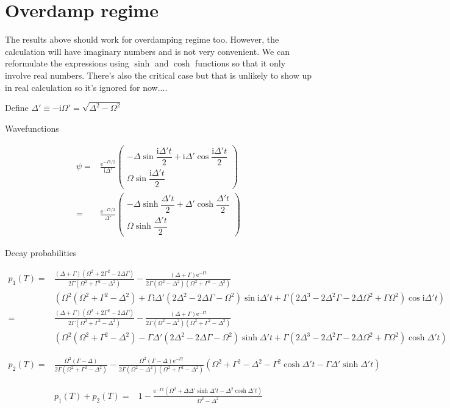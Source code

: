 \documentclass[10pt,fleqn]{article}
\newcommand{\ue}{\mathrm{e}}
\newcommand{\ui}{\mathrm{i}}
\newcommand{\eqar}[1]
{
  \begin{align*}
    #1
  \end{align*}
}
\newcommand{\paren}[1]{{\left({#1}\right)}}
\begin{document}
\section{Overdamp regime}
The results above should work for overdamping regime too.
However, the calculation will have imaginary numbers and is not very convenient.
We can reformulate the expressions using $\sinh$ and $\cosh$ functions so that it only involve
real numbers. There's also the critical case but that is unlikely to show up in real calculation
so it's ignored for now....

Define $\Delta'\equiv-\ui\Omega'=\sqrt{\Delta^2-\Omega^2}$

Wavefunctions
\eqar{
  \psi=&\frac{\ue^{-\Gamma t/2}}{\ui\Delta'}\begin{pmatrix}
    -\Delta\sin\dfrac{\ui\Delta't}{2}+\ui\Delta'\cos\dfrac{\ui\Delta't}{2}\\
    \Omega\sin\dfrac{\ui\Delta't}{2}
  \end{pmatrix}\\
  =&\frac{\ue^{-\Gamma t/2}}{\Delta'}\begin{pmatrix}
    -\Delta\sinh\dfrac{\Delta't}{2}+\Delta'\cosh\dfrac{\Delta't}{2}\\
    \Omega\sinh\dfrac{\Delta't}{2}
  \end{pmatrix}
}
Decay probabilities
\eqar{
  p_1(T)=&\frac{\paren{\Delta+\Gamma}\paren{\Omega^2+2\Gamma^2-2\Delta\Gamma}}{2\Gamma\paren{\Omega^2+\Gamma^2-\Delta^2}}-\frac{\paren{\Delta+\Gamma}\ue^{-\Gamma t}}{2\Gamma\paren{\Omega^2-\Delta^2}\paren{\Omega^2+\Gamma^2-\Delta^2}}\\
  &\paren{\Omega^2\paren{\Omega^2+\Gamma^2-\Delta^2}+\Gamma\ui\Delta'\paren{2\Delta^2-2\Delta\Gamma-\Omega^2}\sin\ui\Delta't+\Gamma\paren{2\Delta^3-2\Delta^2\Gamma-2\Delta\Omega^2+\Gamma\Omega^2}\cos\ui\Delta't}\\
  =&\frac{\paren{\Delta+\Gamma}\paren{\Omega^2+2\Gamma^2-2\Delta\Gamma}}{2\Gamma\paren{\Omega^2+\Gamma^2-\Delta^2}}-\frac{\paren{\Delta+\Gamma}\ue^{-\Gamma t}}{2\Gamma\paren{\Omega^2-\Delta^2}\paren{\Omega^2+\Gamma^2-\Delta^2}}\\
  &\paren{\Omega^2\paren{\Omega^2+\Gamma^2-\Delta^2}-\Gamma\Delta'\paren{2\Delta^2-2\Delta\Gamma-\Omega^2}\sinh\Delta't+\Gamma\paren{2\Delta^3-2\Delta^2\Gamma-2\Delta\Omega^2+\Gamma\Omega^2}\cosh\Delta't}
}
\eqar{
  p_2(T)=&\frac{\Omega^2\paren{\Gamma-\Delta}}{2\Gamma\paren{\Omega^2+\Gamma^2-\Delta^2}}-\frac{\Omega^2\paren{\Gamma-\Delta}\ue^{-\Gamma t}}{2\Gamma\paren{\Omega^2-\Delta^2}\paren{\Omega^2+\Gamma^2-\Delta^2}}\paren{\Omega^2+\Gamma^2-\Delta^2-\Gamma^2\cosh\Delta't-\Gamma\Delta'\sinh\Delta't}
}
\eqar{
  p_1(T)+p_2(T)=&1-\frac{\ue^{-\Gamma t}\paren{\Omega^2+\Delta\Delta'\sinh\Delta't-\Delta^2\cosh\Delta't}}{\Omega^2-\Delta^2}
}
\end{document}
